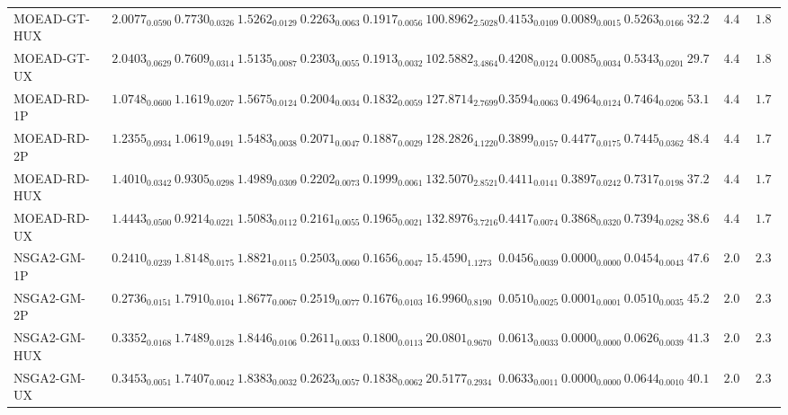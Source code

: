 \documentclass[11pt,a4paper]{article}
\begin{document}
\begin{table}[H]
{\begin{tabular}{lcccccccccccc}
MOEAD-GT-HUX & $2.0077_{0.0590}$ & $0.7730_{0.0326}$ & $1.5262_{0.0129}$ & $0.2263_{0.0063}$ & $0.1917_{0.0056}$ & $100.8962_{2.5028}$ & $0.4153_{0.0109}$ & $0.0089_{0.0015}$ & $0.5263_{0.0166}$ & $32.22$ & $4.44$ & $1.89$ \\
MOEAD-GT-UX & $2.0403_{0.0629}$ & $0.7609_{0.0314}$ & $1.5135_{0.0087}$ & $0.2303_{0.0055}$ & $0.1913_{0.0032}$ & $102.5882_{3.4864}$ & $0.4208_{0.0124}$ & $0.0085_{0.0034}$ & $0.5343_{0.0201}$ & $29.78$ & $4.44$ & $1.89$ \\
MOEAD-RD-1P & $1.0748_{0.0600}$ & $1.1619_{0.0207}$ & $1.5675_{0.0124}$ & $0.2004_{0.0034}$ & $0.1832_{0.0059}$ & $127.8714_{2.7699}$ & $0.3594_{0.0063}$ & $0.4964_{0.0124}$ & $0.7464_{0.0206}$ & $53.11$ & $4.44$ & $\mathbf{1.78}$ \\
MOEAD-RD-2P & $1.2355_{0.0934}$ & $1.0619_{0.0491}$ & $1.5483_{0.0038}$ & $0.2071_{0.0047}$ & $0.1887_{0.0029}$ & $128.2826_{4.1220}$ & $0.3899_{0.0157}$ & $0.4477_{0.0175}$ & $0.7445_{0.0362}$ & $48.44$ & $4.44$ & $\mathbf{1.78}$ \\
MOEAD-RD-HUX & $1.4010_{0.0342}$ & $0.9305_{0.0298}$ & $1.4989_{0.0309}$ & $0.2202_{0.0073}$ & $0.1999_{0.0061}$ & $132.5070_{2.8521}$ & $0.4411_{0.0141}$ & $0.3897_{0.0242}$ & $0.7317_{0.0198}$ & $37.22$ & $4.44$ & $\mathbf{1.78}$ \\
MOEAD-RD-UX & $1.4443_{0.0500}$ & $0.9214_{0.0221}$ & $1.5083_{0.0112}$ & $0.2161_{0.0055}$ & $0.1965_{0.0021}$ & $132.8976_{3.7216}$ & $0.4417_{0.0074}$ & $0.3868_{0.0320}$ & $0.7394_{0.0282}$ & $38.67$ & $4.44$ & $\mathbf{1.78}$ \\
NSGA2-GM-1P & $0.2410_{0.0239}$ & $1.8148_{0.0175}$ & $1.8821_{0.0115}$ & $0.2503_{0.0060}$ & $0.1656_{0.0047}$ & $15.4590_{1.1273}$ & $0.0456_{0.0039}$ & $\mathbf{0.0000}_{0.0000}$ & $0.0454_{0.0043}$ & $47.67$ & $\mathbf{2.00}$ & $2.33$ \\
NSGA2-GM-2P & $0.2736_{0.0151}$ & $1.7910_{0.0104}$ & $1.8677_{0.0067}$ & $0.2519_{0.0077}$ & $0.1676_{0.0103}$ & $16.9960_{0.8190}$ & $0.0510_{0.0025}$ & $\mathbf{0.0001}_{0.0001}$ & $0.0510_{0.0035}$ & $45.22$ & $\mathbf{2.00}$ & $2.33$ \\
NSGA2-GM-HUX & $0.3352_{0.0168}$ & $1.7489_{0.0128}$ & $1.8446_{0.0106}$ & $0.2611_{0.0033}$ & $0.1800_{0.0113}$ & $20.0801_{0.9670}$ & $0.0613_{0.0033}$ & $\mathbf{0.0000}_{0.0000}$ & $0.0626_{0.0039}$ & $41.33$ & $\mathbf{2.00}$ & $2.33$ \\
NSGA2-GM-UX & $0.3453_{0.0051}$ & $1.7407_{0.0042}$ & $1.8383_{0.0032}$ & $0.2623_{0.0057}$ & $0.1838_{0.0062}$ & $20.5177_{0.2934}$ & $0.0633_{0.0011}$ & $\mathbf{0.0000}_{0.0000}$ & $0.0644_{0.0010}$ & $40.11$ & $\mathbf{2.00}$ & $2.33$ \\

\end{tabular}}
\end{table}
\end{document}
